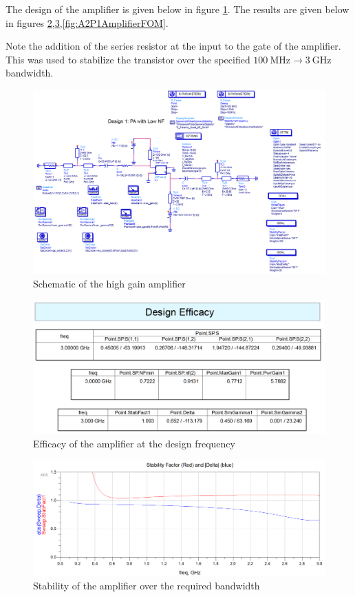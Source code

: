 The design of the amplifier is given below in figure
\ref{fig:A2P1AmplifierSchematic}. The results are given below in figures
\ref{fig:A2P1AmplifierDesignFrequencyEfficacy},\ref{fig:A2P1AmplifierFrequencySweepStability},\ref{fig:A2P1AmplifierFOM}.

Note the addition of the series resistor at the input to the gate of the
amplifier. This was used to stabilize the transistor over the specified $
\SI{100}{\mega\hertz} \rightarrow \SI{3}{\giga\hertz}$ bandwidth.

\begin{figure}[H]
    \centering
    \includegraphics[width=0.8\linewidth]{Images/A2P1AmplifierSchematic.png}
    \caption{Schematic of the high gain amplifier}
    \label{fig:A2P1AmplifierSchematic}
\end{figure}

\begin{figure}[H]
    \centering
    \includegraphics[width=0.8\linewidth]{Images/A2P1AmplifierDesignFrequencyEfficacy.png}
    \caption{Efficacy of the amplifier at the design frequency}
    \label{fig:A2P1AmplifierDesignFrequencyEfficacy}
\end{figure}

\begin{figure}[H]
    \centering
    \includegraphics[width=0.8\linewidth]{Images/A2P1AmplifierFrequencySweepStability.png}
    \caption{Stability of the amplifier over the required bandwidth}
    \label{fig:A2P1AmplifierFrequencySweepStability}
\end{figure}

